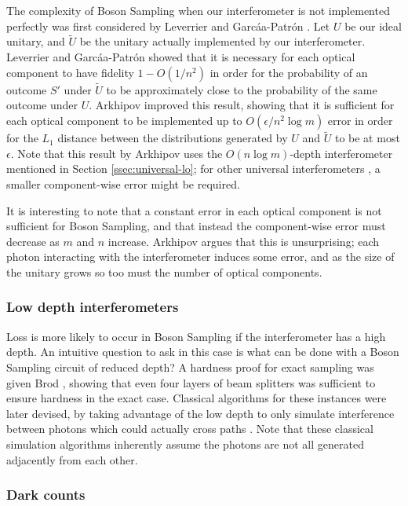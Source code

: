 The complexity of Boson Sampling when our interferometer is not implemented perfectly was first considered by Leverrier and Garc\'{a}a-Patr\'{o}n \cite{leverrier2015}. Let $U$ be our ideal unitary, and $\tilde{U}$ be the unitary actually implemented by our interferometer. Leverrier and Garc\'{a}a-Patr\'{o}n showed that it is necessary for each optical component to have fidelity $1-O(1/n^2)$ in order for the probability of an outcome $S'$ under $\tilde{U}$ to be approximately close to the probability of the same outcome under $U$. Arkhipov \cite{arkhipov2015} improved this result, showing that it is sufficient for each optical component to be implemented up to $O(\epsilon/n^2\log m)$ error in order for the $L_1$ distance between the distributions generated by $U$ and $\tilde{U}$ to be at most $\epsilon$. Note that this result by Arkhipov uses the $O(n\log m)$-depth interferometer mentioned in Section \ref{ssec:universal-lo}; for other universal interferometers \cite{hurwitz1897, reck1994, clements2016}, a smaller component-wise error might be required.

It is interesting to note that a constant error in each optical component is not sufficient for Boson Sampling, and that instead the component-wise error must decrease as $m$ and $n$ increase. Arkhipov argues that this is unsurprising; each photon interacting with the interferometer induces some error, and as the size of the unitary grows so too must the number of optical components.

\subsubsection{Low depth interferometers}

Loss is more likely to occur in Boson Sampling if the interferometer has a high depth. An intuitive question to ask in this case is what can be done with a Boson Sampling circuit of reduced depth? A hardness proof for exact sampling was given Brod \cite{brod2015}, showing that even four layers of beam splitters was sufficient to ensure hardness in the exact case. Classical algorithms for these instances were later devised, by taking advantage of the low depth to only simulate interference between photons which could actually cross paths \cite{deshpande2018, maskara2019}. Note that these classical simulation algorithms inherently assume the photons are not all generated adjacently from each other.

\subsubsection{Dark counts}

